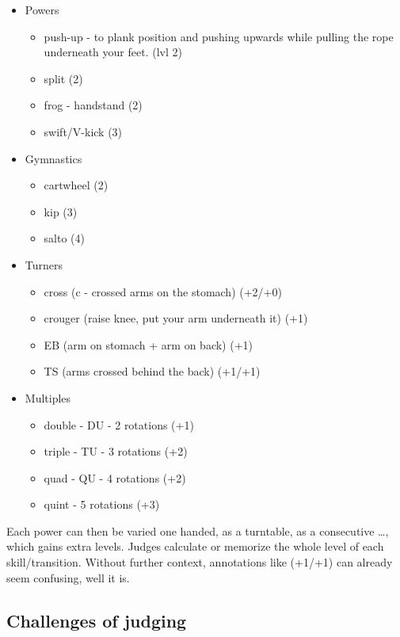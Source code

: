 \begin{itemize}
    \item Powers
    \begin{itemize}
        \item push-up - to plank position and pushing upwards while pulling the rope underneath your feet. (lvl 2)
        \item split (2)
        \item frog - handstand (2)
        \item swift/V-kick (3)
    \end{itemize}
    \item Gymnastics
    \begin{itemize}
        \item cartwheel (2)
        \item kip (3)
        \item salto (4)
    \end{itemize}
    \item Turners
    \begin{itemize}
        \item cross (c - crossed arms on the stomach) (+2/+0)
        \item crouger (raise knee, put your arm underneath it) (+1)
        \item EB (arm on stomach + arm on back) (+1)
        \item TS (arms crossed behind the back) (+1/+1)
    \end{itemize}
    \item Multiples
    \begin{itemize}
        \item double - DU - 2 rotations (+1)
        \item triple - TU - 3 rotations (+2)
        \item quad - QU - 4 rotations (+2)
        \item quint - 5 rotations (+3)
    \end{itemize}
\end{itemize}

Each power can then be varied one handed, as a turntable, as a consecutive \dots, which gains extra levels. Judges calculate or memorize the whole level of each skill/transition. Without further context, annotations like (+1/+1) can already seem confusing, well it is.



\subsection{Challenges of judging}

